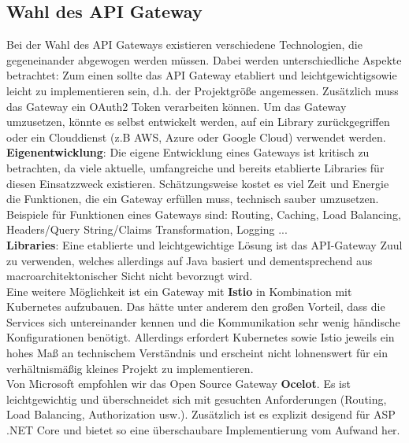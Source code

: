 {\subsection{Wahl des API Gateway}

Bei der Wahl des API Gateways existieren verschiedene Technologien, die gegeneinander abgewogen werden müssen. Dabei werden unterschiedliche Aspekte betrachtet: Zum einen sollte das API Gateway etabliert und leichtgewichtigsowie leicht zu implementieren sein, d.h. der Projektgröße angemessen. Zusätzlich muss das Gateway ein OAuth2 Token verarbeiten können. Um das Gateway umzusetzen, könnte es selbst entwickelt werden, auf ein Library zurückgegriffen oder ein Clouddienst (z.B AWS, Azure oder Google Cloud) verwendet werden. \\

\textbf{Eigenentwicklung}: Die eigene Entwicklung eines Gateways ist kritisch zu betrachten, da viele aktuelle, umfangreiche und bereits etablierte Libraries für diesen Einsatzzweck existieren. Schätzungsweise kostet es viel Zeit und Energie die Funktionen, die ein Gateway erfüllen muss, technisch sauber umzusetzen. Beispiele für Funktionen eines Gateways sind: Routing, Caching, Load Balancing, Headers/Query String/Claims Transformation, Logging ...  \\

\textbf{Libraries}: Eine etablierte und leichtgewichtige Lösung ist das API-Gateway Zuul zu verwenden, welches allerdings auf Java basiert und dementsprechend aus macroarchitektonischer Sicht nicht bevorzugt wird. \\

Eine weitere Möglichkeit ist ein Gateway mit \textbf{Istio} in Kombination mit Kubernetes aufzubauen. Das hätte unter anderem den großen Vorteil, dass die Services sich untereinander kennen und die Kommunikation sehr wenig händische Konfigurationen benötigt. Allerdings erfordert Kubernetes sowie Istio jeweils ein hohes Maß an technischem Verständnis und erscheint nicht lohnenswert für ein verhältnismäßig kleines Projekt zu implementieren.\cite{HeiseIstio}\cite{istioQuickstart} \\    

Von Microsoft empfohlen wir das Open Source Gateway \textbf{Ocelot}. Es ist leichtgewichtig und überschneidet sich mit gesuchten Anforderungen (Routing, Load Balancing, Authorization usw.). Zusätzlich ist es explizit desigend für ASP .NET Core und bietet so eine überschaubare Implementierung vom Aufwand her.\cite{microsoftOcelot}\\

}
